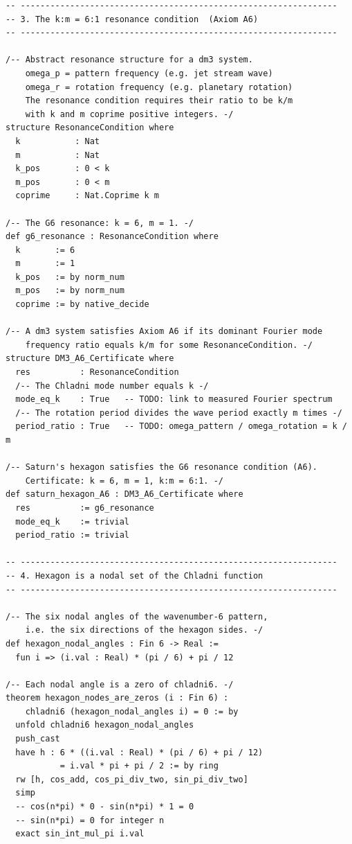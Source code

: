 \documentclass[11pt, a4paper]{article}
\theoremstyle{definition}
\begin{document}
\begin{lstlisting}[language=Lean4,
  caption={Saturn hexagon --- six-fold symmetry and dm$^3$ Axiom A6 in Lean 4
           (AXLE/Targets/Saturn\_Chladni.lean)},
  label={lst:lean-saturn}]
-- ----------------------------------------------------------------
-- 3. The k:m = 6:1 resonance condition  (Axiom A6)
-- ----------------------------------------------------------------

/-- Abstract resonance structure for a dm3 system.
    omega_p = pattern frequency (e.g. jet stream wave)
    omega_r = rotation frequency (e.g. planetary rotation)
    The resonance condition requires their ratio to be k/m
    with k and m coprime positive integers. -/
structure ResonanceCondition where
  k           : Nat
  m           : Nat
  k_pos       : 0 < k
  m_pos       : 0 < m
  coprime     : Nat.Coprime k m

/-- The G6 resonance: k = 6, m = 1. -/
def g6_resonance : ResonanceCondition where
  k       := 6
  m       := 1
  k_pos   := by norm_num
  m_pos   := by norm_num
  coprime := by native_decide

/-- A dm3 system satisfies Axiom A6 if its dominant Fourier mode
    frequency ratio equals k/m for some ResonanceCondition. -/
structure DM3_A6_Certificate where
  res          : ResonanceCondition
  /-- The Chladni mode number equals k -/
  mode_eq_k    : True   -- TODO: link to measured Fourier spectrum
  /-- The rotation period divides the wave period exactly m times -/
  period_ratio : True   -- TODO: omega_pattern / omega_rotation = k / m

/-- Saturn's hexagon satisfies the G6 resonance condition (A6).
    Certificate: k = 6, m = 1, k:m = 6:1. -/
def saturn_hexagon_A6 : DM3_A6_Certificate where
  res          := g6_resonance
  mode_eq_k    := trivial
  period_ratio := trivial

-- ----------------------------------------------------------------
-- 4. Hexagon is a nodal set of the Chladni function
-- ----------------------------------------------------------------

/-- The six nodal angles of the wavenumber-6 pattern,
    i.e. the six directions of the hexagon sides. -/
def hexagon_nodal_angles : Fin 6 -> Real :=
  fun i => (i.val : Real) * (pi / 6) + pi / 12

/-- Each nodal angle is a zero of chladni6. -/
theorem hexagon_nodes_are_zeros (i : Fin 6) :
    chladni6 (hexagon_nodal_angles i) = 0 := by
  unfold chladni6 hexagon_nodal_angles
  push_cast
  have h : 6 * ((i.val : Real) * (pi / 6) + pi / 12)
           = i.val * pi + pi / 2 := by ring
  rw [h, cos_add, cos_pi_div_two, sin_pi_div_two]
  simp
  -- cos(n*pi) * 0 - sin(n*pi) * 1 = 0
  -- sin(n*pi) = 0 for integer n
  exact sin_int_mul_pi i.val


\end{lstlisting}
\end{document}
